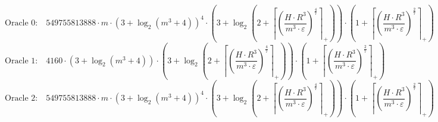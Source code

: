 \[\text{Oracle 0:}\quad 549755813888 \cdot m \cdot \left(3 + \log_{2}\left(m^{3} + 4\right)\right)^{4} \cdot \left(3 + \log_{2}\left(2 + \left\lceil \left(\frac{H \cdot R^{3}}{m^{3} \cdot \varepsilon}\right)^{\frac{4}{7}} \right\rceil_{+}\right)\right) \cdot \left(1 + \left\lceil \left(\frac{H \cdot R^{3}}{m^{3} \cdot \varepsilon}\right)^{\frac{2}{7}} \right\rceil_{+}\right)\]
\[\text{Oracle 1:}\quad 4160 \cdot \left(3 + \log_{2}\left(m^{3} + 4\right)\right) \cdot \left(3 + \log_{2}\left(2 + \left\lceil \left(\frac{H \cdot R^{3}}{m^{3} \cdot \varepsilon}\right)^{\frac{4}{7}} \right\rceil_{+}\right)\right) \cdot \left(1 + \left\lceil \left(\frac{H \cdot R^{3}}{m^{3} \cdot \varepsilon}\right)^{\frac{2}{7}} \right\rceil_{+}\right)\]
\[\text{Oracle 2:}\quad 549755813888 \cdot m \cdot \left(3 + \log_{2}\left(m^{3} + 4\right)\right)^{4} \cdot \left(3 + \log_{2}\left(2 + \left\lceil \left(\frac{H \cdot R^{3}}{m^{3} \cdot \varepsilon}\right)^{\frac{4}{7}} \right\rceil_{+}\right)\right) \cdot \left(1 + \left\lceil \left(\frac{H \cdot R^{3}}{m^{3} \cdot \varepsilon}\right)^{\frac{2}{7}} \right\rceil_{+}\right)\]

